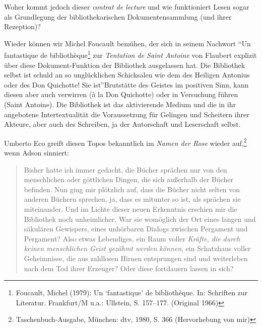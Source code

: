 Woher kommt jedoch dieser \emph{contrat de lecture} und wie funktioniert
Lesen sogar als Grundlegung der bibliothekarischen Dokumentensammlung
(und ihrer Rezeption)?

Wieder können wir Michel Foucault bemühen, der sich in seinem Nachwort
\enquote{Un fantastique de bibliothèque\footnote{Foucault, Michel
  (1979): Un \enquote{fantastique} de bibliothèque. In: Schriften zur
  Literatur. Frankfurt/M u.a.: Ullstein, S. 157--177. (Original 1966)}
zur \emph{Tentation de Saint Antoine} von Flaubert explizit über diese
Dokument-Funktion der Bibliothek ausgelassen hat. Die Bibliothek selbst
ist schuld an so unglücklichen Schicksalen wie dem des Heiligen Antonius
oder des Don Quichotte! Sie ist}Brutstätte des Geistes im positiven
Sinn, kann diesen aber auch verwirren (à la Don Quichotte) oder in
Versuchung führen (Saint Antoine). Die Bibliothek ist das aktivierende
Medium und die in ihr angebotene Intertextualität die Voraussetzung für
Gelingen und Scheitern ihrer Akteure, aber auch des Schreiben, ja der
Autorschaft und Leserschaft selbst.

Umberto Eco greift diesen Topos bekanntlich im \emph{Namen der Rose}
wieder auf,\footnote{Taschenbuch-Ausgabe, München: dtv, 1980, S. 366
  (Hervorhebung von mir)} wenn Adson sinniert:

\begin{quote}
Bisher hatte ich immer gedacht, die Bücher sprächen nur von den
menschlichen oder göttlichen Dingen, die sich außerhalb der Bücher
befinden. Nun ging mir plötzlich auf, dass die Bücher nicht selten von
anderen Büchern sprechen, ja, dass es mitunter so ist, als sprächen sie
miteinander. Und im Lichte dieser neuen Erkenntnis erschien mir die
Bibliothek noch unheimlicher. War sie womöglich der Ort eines langen und
säkulären Gewispers, eines unhörbaren Dialogs zwischen Pergament und
Pergament? Also etwas Lebendiges, ein Raum voller \emph{Kräfte, die
durch keinen menschlichen Geist gezähmt werden können}, ein Schatzhaus
voller Geheimnisse, die aus zahllosen Hirnen entsprungen sind und
weiterleben nach dem Tod ihrer Erzeuger? Oder diese fortdauern lassen in
sich?
\end{quote}

